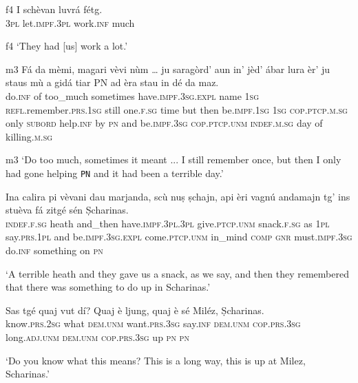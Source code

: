 \begin{linenumbers}
	\gll {\ob}f4{\cb} I schèvan luvrá fétg.\\
{}	\textsc{3pl} let.\textsc{impf.3pl} work.\textsc{inf} much\\
\end{linenumbers}
\medskip
\glt {\ob}f4{\cb} `They had [us] work a lot.'
\medskip

\begin{linenumbers}
	\gll  {\ob}m3{\cb} Fá da mèmi, magari vèvi nùm … ju saragòrd’ aun in' jèd’ ábar lura èr’ ju staus mù a gidá tiar PN ad èra stau in dé da maz.\\
{}	do.\textsc{inf} of too\_much sometimes have.\textsc{impf.3sg.expl} name {} \textsc{1sg} \textsc{refl}.remember.\textsc{prs.1sg} still one.\textsc{f.sg} time but then be.\textsc{impf.1sg} \textsc{1sg} \textsc{cop.ptcp.m.sg} only \textsc{subord} help.\textsc{inf} by \textsc{pn} and be.\textsc{impf.3sg} \textsc{cop.ptcp.unm} \textsc{indef.m.sg} day of killing.\textsc{m.sg}\\
\end{linenumbers}
\medskip
\glt {\ob}m3{\cb} `Do too much, sometimes it meant ... I still remember once, but then I only had gone helping \texttt{PN} and it had been a terrible day.'
\medskip

\begin{linenumbers}
	\gll Ina calira pi vèvani dau marjanda, scù nuṣ ṣchajn, api èri vagnú andamajn tg’ ins stuèva fá zitgé sén Ṣcharinas.   \\
	\textsc{indef.f.sg} heath and\_then  have.\textsc{impf.3pl.3pl} give.\textsc{ptcp.unm} snack.\textsc{f.sg} as \textsc{1pl} say.\textsc{prs.1pl} and be.\textsc{impf.3sg.expl} come.\textsc{ptcp.unm} in\_mind \textsc{comp} \textsc{gnr} must.\textsc{impf.3sg} do.\textsc{inf} something on \textsc{pn} \\
\end{linenumbers}
\medskip
\glt `A terrible heath and they gave us a snack, as we say, and then they remembered that there was something to do up in Scharinas.'
\medskip

\begin{linenumbers}
	\gll Sas tgé quaj vut dí? Quaj è ljung, quaj è sé Miléz, Ṣcharinas.   \\
	know.\textsc{prs.2sg} what \textsc{dem.unm} want.\textsc{prs.3sg} say.\textsc{inf} \textsc{dem.unm} \textsc{cop.prs.3sg} long.\textsc{adj.unm} \textsc{dem.unm} \textsc{cop.prs.3sg} up \textsc{pn} \textsc{pn}\\
\end{linenumbers}
\medskip
\glt `Do you know what this means? This is a long way, this is up at Milez, Scharinas.'
\medskip

